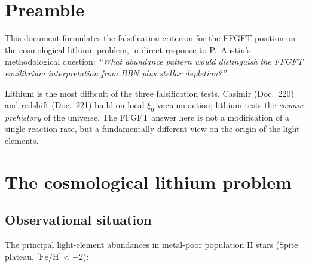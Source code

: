 
\section*{Preamble}

This document formulates the falsification criterion for the FFGFT
position on the cosmological lithium problem, in direct response to
P.~Austin's methodological question:
\emph{\enquote{What abundance pattern would distinguish the FFGFT
equilibrium interpretation from BBN plus stellar depletion?}}

Lithium is the most difficult of the three falsification tests.
Casimir (Doc.~220) and redshift (Doc.~221) build on local
$\xi_0$-vacuum action; lithium tests the \emph{cosmic prehistory} of
the universe. The FFGFT answer here is not a modification of a single
reaction rate, but a fundamentally different view on the origin of
the light elements.

\section{The cosmological lithium problem}

\subsection{Observational situation}

The principal light-element abundances in metal-poor population II
stars (Spite plateau, $\text{[Fe/H]} < -2$):

